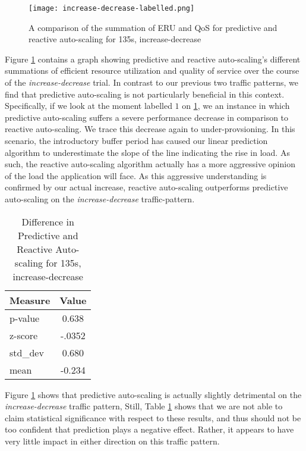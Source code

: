 \begin{figure}[!h]
  \centerline{\texttt{[image: increase-decrease-labelled.png]}}
  \caption{A comparison of the summation of ERU and QoS for
    predictive and reactive auto-scaling for 135s, increase-decrease}
  \label{fig:135s-increase-decrease-labelled}
\end{figure}

Figure \ref{fig:135s-increase-decrease-labelled} contains a graph
showing predictive and reactive auto-scaling's different
summations of efficient resource utilization and quality of service over the
course of the \textit{increase-decrease} trial. In contrast to our previous two
traffic patterns, we find that predictive auto-scaling is not particularly
beneficial in this context. Specifically, if we look at the moment labelled
$1$ on \ref{fig:135s-increase-decrease-labelled}, we an instance in which
predictive auto-scaling suffers a severe performance decrease in comparison to
reactive auto-scaling. We trace this decrease again to under-provsioning. In
this scenario, the introductory buffer period has caused our linear prediction
algorithm to underestimate the slope of the line indicating the rise in load. As
such, the reactive auto-scaling algorithm actually has a more aggressive opinion
of the load the application will face. As this aggressive understanding is
confirmed by our actual increase, reactive auto-scaling outperforms predictive
auto-scaling on the \textit{increase-decrease} traffic-pattern.

\begin{table}[htbp]
  \centering
  \caption{Difference in Predictive and Reactive Auto-scaling for 135s, increase-decrease}
  \label{tab:135s-increase-decrease}
\begin{tabular}{l c}\hline\hline
    \multicolumn{1}{c}{\textbf{Measure}} & \textbf{Value} \\ \hline
     p-value & 0.638 \\
     z-score & -.0352 \\
     std\_dev & 0.680 \\
     mean & -0.234
  \end{tabular}
\end{table}

Figure \ref{fig:135s-increase-decrease-labelled} shows that predictive
auto-scaling is actually slightly detrimental on the \textit{increase-decrease} traffic pattern,
Still, Table \ref{tab:135s-increase-decrease} shows that we are not able to claim
statistical significance with respect to these results, and thus should not be
too confident that prediction plays a negative effect. Rather, it appears to
have very little impact in either direction on this traffic pattern.
